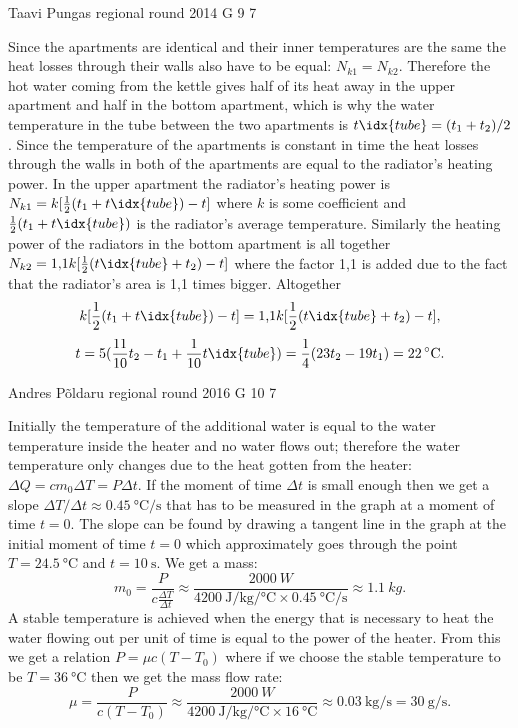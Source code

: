 \documentclass[11pt]{article}
\begin{document}
{Taavi Pungas} %
{regional round} %
{2014} %
{G 9} %
{7} %
{

\ifEngSolution
Since the apartments are identical and their inner temperatures are the same the heat losses through their walls also have to be equal: $N_{k1}=N_{k2}$. Therefore the hot water coming from the kettle gives half of its heat away in the upper apartment and half in the bottom apartment, which is why the water temperature in the tube between the two apartments is $t\idx{tube}=(t_1+t_2)/2$. Since the temperature of the apartments is constant in time the heat losses through the walls in both of the apartments are equal to the radiator’s heating power. In the upper apartment the radiator’s heating power is $N_{k1}=k[\frac{1}{2}(t_1+t\idx{tube})-t]$ where $k$ is some coefficient and $\frac{1}{2}(t_1+t\idx{tube})$ is the radiator’s average temperature. Similarly the heating power of the radiators in the bottom apartment is all together $N_{k2}=\text{1,1} k[\frac{1}{2}(t\idx{tube}+t_{2})-t]$ where the factor 1,1 is added due to the fact that the radiator’s area is 1,1 times bigger. Altogether
\[ k[\frac{1}{2}(t_1+t\idx{tube})-t]=\text{1,1}k[\frac{1}{2}(t\idx{tube}+t_{2})-t], \]
\[ t=5 (\frac{11}{10}t_2-t_1+\frac{1}{10}t\idx{tube})=\frac{1}{4}(23t_2-19t_1)=22\,^{\circ}\mathrm{C}. \]
\fi
}

{Andres Põldaru} %
{regional round} %
{2016} %
{G 10} %
{7} %
{

\ifEngSolution
Initially the temperature of the additional water is equal to the water temperature inside the heater and no water flows out; therefore the water temperature only changes due to the heat gotten from the heater: $\Delta Q = c m_0 \Delta T = P \Delta t$. If the moment of time $\Delta t$ is small enough then we get a slope $\Delta T / \Delta t \approx \SI{0,45}{\celsius\per\second}$ that has to be measured in the graph at a moment of time $t=0$. The slope can be found by drawing a tangent line in the graph at the initial moment of time $t=0$ which approximately goes through the point $T=\SI{24.5}{\celsius}$ and $t = \SI{10}{\second}$. We get a mass:
$$m_0 = \frac{P}{c \frac{\Delta T}{\Delta t}} \approx \frac{\SI{2000}{W}}{\SI{4200}{\joule \per \kilogram \per \celsius}\times\SI{0,45}{\celsius\per\second}} \approx \SI{1.1}{kg}.$$
A stable temperature is achieved when the energy that is necessary to heat the water flowing out per unit of time is equal to the power of the heater. From this we get a relation $P=\mu c(T-T_0)$ where if we choose the stable temperature to be $T=\SI{36}{\celsius}$ then we get the mass flow rate:
$$\mu = \frac{P}{c(T-T_0)} \approx \frac{\SI{2000}{W}}{\SI{4200}{\joule \per \kilogram \per\celsius}\times \SI{16}{\celsius}} \approx \SI{0.03}{\kilogram\per\second}=\SI{30}{\gram\per\second}.$$
\fi
}
\end{document}
